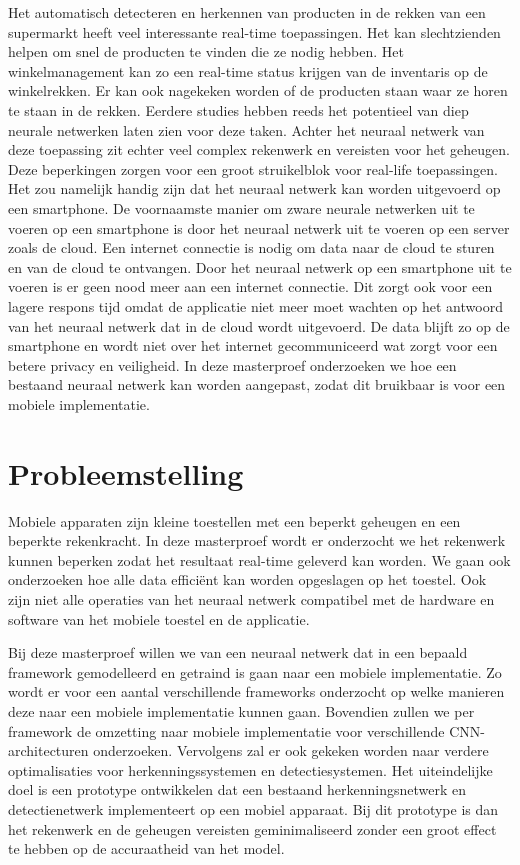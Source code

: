 Het automatisch detecteren en herkennen van producten in de rekken van een supermarkt heeft veel interessante real-time toepassingen.
Het kan slechtzienden helpen om snel de producten te vinden die ze nodig hebben. 
Het winkelmanagement kan zo een real-time status krijgen van de inventaris op de winkelrekken.
Er kan ook nagekeken worden of de producten staan waar ze horen te staan in de rekken.
Eerdere studies hebben reeds het potentieel van diep neurale netwerken laten zien voor deze taken.
Achter het neuraal netwerk van deze toepassing zit echter veel complex rekenwerk en vereisten voor het geheugen.
Deze beperkingen zorgen voor een groot struikelblok voor real-life toepassingen.
Het zou namelijk handig zijn dat het neuraal netwerk kan worden uitgevoerd op een smartphone.
De voornaamste manier om zware neurale netwerken uit te voeren op een smartphone is door het neuraal netwerk uit te voeren op een server zoals de cloud.
Een internet connectie is nodig om data naar de cloud te sturen en van de cloud te ontvangen.
Door het neuraal netwerk op een smartphone uit te voeren is er geen nood meer aan een internet connectie.
Dit zorgt ook voor een lagere respons tijd omdat de applicatie niet meer moet wachten op het antwoord van het neuraal netwerk dat in de cloud wordt uitgevoerd.
De data blijft zo op de smartphone en wordt niet over het internet gecommuniceerd wat zorgt voor een betere privacy en veiligheid. 
In deze masterproef onderzoeken we hoe een bestaand neuraal netwerk kan worden aangepast, zodat dit bruikbaar is voor een mobiele implementatie.

\section{Probleemstelling}
Mobiele apparaten zijn kleine toestellen met een beperkt geheugen en een beperkte rekenkracht. 
In deze masterproef wordt er onderzocht we het rekenwerk kunnen beperken zodat het resultaat real-time geleverd kan worden. 
We gaan ook onderzoeken hoe alle data effici\"ent kan worden opgeslagen op het toestel. 
Ook zijn niet alle operaties van het neuraal netwerk compatibel met de hardware en software van het mobiele toestel en de applicatie. 

Bij deze masterproef willen we van een neuraal netwerk dat in een bepaald framework gemodelleerd en getraind is gaan naar een mobiele implementatie.
Zo wordt er voor een aantal verschillende frameworks onderzocht op welke manieren deze naar een mobiele implementatie kunnen gaan.
Bovendien zullen we per framework de omzetting naar mobiele implementatie voor verschillende CNN-architecturen onderzoeken. 
Vervolgens zal er ook gekeken worden naar verdere optimalisaties voor herkenningssystemen en detectiesystemen. 
Het uiteindelijke doel is een prototype ontwikkelen dat een bestaand herkenningsnetwerk en detectienetwerk implementeert op een mobiel apparaat. 
Bij dit prototype is dan het rekenwerk en de geheugen vereisten geminimaliseerd zonder een groot effect te hebben op de accuraatheid van het model.

